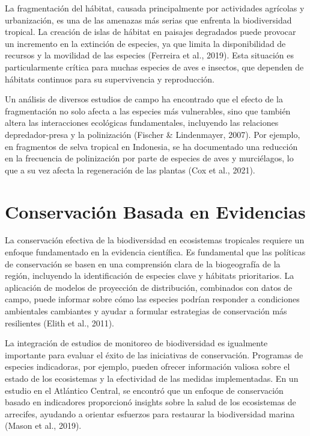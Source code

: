\documentclass[
  letterpaper,
  DIV=11,
  numbers=noendperiod,
  oneside]{scrreprt}
\begin{document}
La fragmentación del hábitat, causada principalmente por actividades
agrícolas y urbanización, es una de las amenazas más serias que enfrenta
la biodiversidad tropical. La creación de islas de hábitat en paisajes
degradados puede provocar un incremento en la extinción de especies, ya
que limita la disponibilidad de recursos y la movilidad de las especies
(Ferreira et al., 2019). Esta situación es particularmente crítica para
muchas especies de aves e insectos, que dependen de hábitats continuos
para su supervivencia y reproducción.

Un análisis de diversos estudios de campo ha encontrado que el efecto de
la fragmentación no solo afecta a las especies más vulnerables, sino que
también altera las interacciones ecológicas fundamentales, incluyendo
las relaciones depredador-presa y la polinización (Fischer \&
Lindenmayer, 2007). Por ejemplo, en fragmentos de selva tropical en
Indonesia, se ha documentado una reducción en la frecuencia de
polinización por parte de especies de aves y murciélagos, lo que a su
vez afecta la regeneración de las plantas (Cox et al., 2021).

\section{Conservación Basada en
Evidencias}\label{conservaciuxf3n-basada-en-evidencias}

La conservación efectiva de la biodiversidad en ecosistemas tropicales
requiere un enfoque fundamentado en la evidencia científica. Es
fundamental que las políticas de conservación se basen en una
comprensión clara de la biogeografía de la región, incluyendo la
identificación de especies clave y hábitats prioritarios. La aplicación
de modelos de proyección de distribución, combinados con datos de campo,
puede informar sobre cómo las especies podrían responder a condiciones
ambientales cambiantes y ayudar a formular estrategias de conservación
más resilientes (Elith et al., 2011).

La integración de estudios de monitoreo de biodiversidad es igualmente
importante para evaluar el éxito de las iniciativas de conservación.
Programas de especies indicadoras, por ejemplo, pueden ofrecer
información valiosa sobre el estado de los ecosistemas y la efectividad
de las medidas implementadas. En un estudio en el Atlántico Central, se
encontró que un enfoque de conservación basado en indicadores
proporcionó insights sobre la salud de los ecosistemas de arrecifes,
ayudando a orientar esfuerzos para restaurar la biodiversidad marina
(Mason et al., 2019).
\end{document}
